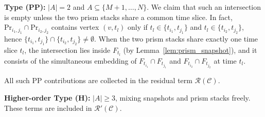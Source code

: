 \documentclass[
    pre,
    twocolumn,
    superscriptaddress,
    showpacs,
    nofootinbib,
    amsmath,
    amssymb,
    floatfix
]{revtex4-2}
\theoremstyle{plain} %
\theoremstyle{definition} %
\begin{document}
\textbf{Type (PP):} $|A| = 2$ and $A \subseteq \{M+1, \ldots, N\}$.
We claim that such an intersection is empty unless the two prism
stacks share a common time slice.
In fact, $\mathrm{Pr}_{i_1, j_1} \cap \mathrm{Pr}_{i_2, j_2}$ contains
vertex $(v, t_l)$ only if $t_l \in \{t_{i_1}, t_{j_1}\}$ and
$t_l \in \{t_{i_2}, t_{j_2}\}$, hence
$\{t_{i_1}, t_{j_1}\} \cap \{t_{i_2}, t_{j_2}\} \neq \emptyset$.
When the two prism stacks share exactly one time slice $t_l$, the
intersection lies inside $F_{t_l}$ (by Lemma~\ref{lem:prism_snapshot}),
and it consists of the simultaneous embedding of
$F_{t_{i_1}} \cap F_{t_{j_1}}$ and $F_{t_{i_2}} \cap F_{t_{j_2}}$
at time $t_l$.

All such PP contributions are collected in the residual term
$\mathcal{R}(\mathcal{C})$.

\textbf{Higher-order Type (H):} $|A| \ge 3$, mixing snapshots and
prism stacks freely.
These terms are included in $\mathcal{R}'(\mathcal{C})$.
\end{document}
